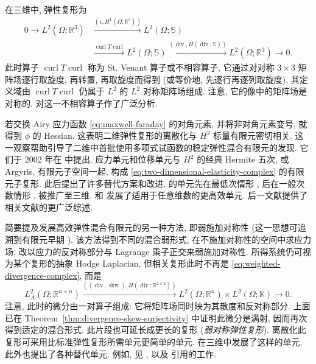 {在三维中, 弹性复形为}
\[
\begin{aligned}
0\to L^2(\Omega;\mathbb R^3)&\xrightarrow{(\epsilon,H^1(\Omega;\mathbb R^3))}L^2(\Omega;\mathbb S)\\
&\xrightarrow{\operatorname{curl}T\operatorname{curl}}L^2(\Omega;\mathbb S)\xrightarrow{(\operatorname{div},H(\operatorname{div};\mathbb S))}L^2(\Omega;\mathbb R^3)\to0.
\end{aligned}
\]
{此时算子 $\operatorname{curl}T\operatorname{curl}$ 称为 St. Venant 算子或不相容算子, 它通过对对称 $3\times3$ 矩阵场逐行取旋度, 再转置, 再取旋度而得到 (或等价地, 先逐行再逐列取旋度). 其定义域由 $\operatorname{curl}T\operatorname{curl}$ 仍属于 $L^2$ 的 $L^2$ 对称矩阵场组成. 注意, 它的像中的矩阵场是对称的.  对这一不相容算子作了广泛分析.}

{若交换 Airy 应力函数 \eqref{eq:maxwell-faraday} 的对角元素, 并将非对角元素变号, 就得到 $\phi$ 的 Hessian. 这表明二维弹性复形的离散化与 $H^2$ 标量有限元密切相关. 这一观察帮助引导了二维中首批使用多项式试函数的稳定弹性混合有限元的发现. 它们于 2002 年在  中提出. 应力单元和位移单元与 $H^2$ 的经典 Hermite 五次, 或 Argyris, 有限元子空间一起, 构成 \eqref{eq:two-dimensional-elasticity-complex} 的有限元子复形. 此后提出了许多替代方案和改进.  的单元先在最低次情形 , 后在一般次数情形 , 被推广至三维.  和  发展了适用于任意维数的更高效单元. 后一文献提供了相关文献的更广泛综述.}

{简要提及发展高效弹性混合有限元的另一种方法, 即弱施加对称性 (这一思想可追溯到有限元早期 ). 该方法得到不同的混合弱形式, 在不施加对称性的空间中求应力场, 改以应力的反对称部分与 Lagrange 乘子正交来弱施加对称性. 所得系统仍可视为某个复形的抽象 Hodge Laplacian, 但相关复形此时不再是 \eqref{eq:weighted-divergence-complex}, 而是}
\[
L_A^2(\Omega;\mathbb R^{n\times n})\xrightarrow{((\operatorname{div},\operatorname{skw}),H(\operatorname{div};\mathbb R^{2\times2}))}L^2(\Omega;\mathbb R^n)\times L^2(\Omega;\mathbb K)\to0.
\]
{注意, 此时的微分由一对算子组成: 它将矩阵场同时映为其散度和反对称部分. 上面已在 Theorem~\ref{thm:divergence-skew-surjectivity} 中证明此微分是满射, 因而再次得到适定的混合形式. 此片段也可延长成更长的复形 (\emph{弱对称弹性复形}). 离散化此复形可采用比标准弹性复形所需单元更简单的单元.  在三维中发展了这样的单元, 此外也提出了各种替代单元. 例如, 见 ,  以及  引用的工作.}

